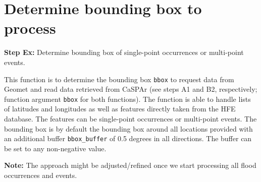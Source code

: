 \documentclass[10pt,a4paper,titlepage,parskip]{scrartcl}
\begin{document}
\clearpage 

\section{Determine bounding box to process}

\textbf{Step Ex:} Determine bounding box of single-point occurrences or multi-point events.

This function is to determine the bounding box \texttt{bbox} to request data from Geomet and read data retrieved from CaSPAr (see steps A1 and B2, respectively; function argument \texttt{bbox} for both functions). The function is able to handle lists of latitudes and longitudes as well as features directly taken from the HFE database. The features can be single-point occurrences or multi-point events. The bounding box is by default the bounding box around all locations provided with an additional buffer \texttt{bbox\_buffer} of 0.5 degrees in all directions. The buffer can be set to any non-negative value.

\textbf{Note:} The approach might be adjusted/refined once we start processing all flood occurrences and events.
\end{document}
